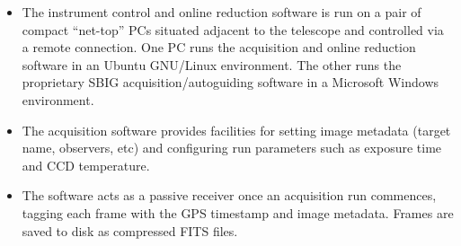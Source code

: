 \vspace{-1.75cm}
\begin{itemize}[itemsep=20pt]
\item[] The instrument control and online reduction software is run on a pair of
compact ``net-top'' PCs situated adjacent to the telescope and controlled via a remote
connection. One PC runs the acquisition and online reduction software
in an Ubuntu GNU/Linux environment. The other runs the proprietary SBIG
acquisition/autoguiding software in a Microsoft Windows environment.

\item[] The acquisition software provides facilities for setting image metadata
(target name, observers, etc) and configuring run parameters such as exposure
time and CCD temperature.

\item[] The software acts as a passive receiver once an acquisition run
commences, tagging each frame with the GPS timestamp and image metadata. 
Frames are saved to disk as compressed FITS files.

\end{itemize}
\vspace{-1.75cm}